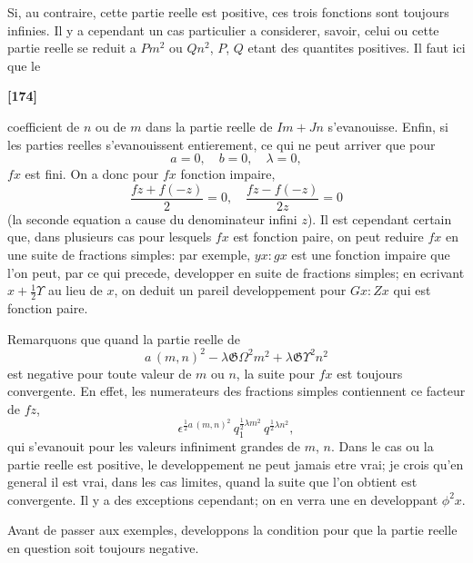 \documentclass[11pt,a4paper]{book}
\begin{document}
Si, au contraire, cette partie reelle est positive, ces trois fonctions sont toujours infinies.
Il y a cependant un cas particulier a considerer, savoir, celui ou cette partie reelle
se reduit a $Pm^2$ ou $Qn^2$, $P$, $Q$ etant des quantites positives. Il faut ici que le

\textbf{[174]}

coefficient de $n$ ou de $m$ dans la partie reelle de $Im + Jn$ s'evanouisse. Enfin, si les
parties reelles s'evanouissent entierement, ce qui ne peut arriver que pour
\[a = 0,\quad b = 0,\quad \lambda = 0,\]
$fx$ est fini. On a donc pour $fx$ fonction impaire,
\[\frac{fz + f(-z)}{2} = 0,\quad \frac{fz - f(-z)}{2z} = 0\]
(la seconde equation a cause du denominateur infini $z$). Il est cependant certain que,
dans plusieurs cas pour lesquels $fx$ est fonction paire, on peut reduire $fx$ en une suite
de fractions simples: par exemple, $yx : gx$ est une fonction impaire que l'on peut, par
ce qui precede, developper en suite de fractions simples; en ecrivant $x + \frac{1}{2}\Upsilon$ au lieu
de $x$, on deduit un pareil developpement pour $Gx : Zx$ qui est fonction paire.

Remarquons que quand la partie reelle de
\[a\, (m, n)^2 - \lambda\mathfrak{G}\Omega^2 m^2 + \lambda\mathfrak{G}\Upsilon^2 n^2\]
est negative pour toute valeur de $m$ ou $n$, la suite pour $fx$ est toujours convergente.
En effet, les numerateurs des fractions simples contiennent ce facteur de $fz$,
\[\epsilon^{\frac{1}{2}a\, (m, n)^2}\, q_1^{\frac{1}{2}\lambda m^2}\, q^{\frac{1}{2}\lambda n^2},\]
qui s'evanouit pour les valeurs infiniment grandes de $m$, $n$. Dans le cas ou la partie
reelle est positive, le developpement ne peut jamais etre vrai; je crois qu'en general
il est vrai, dans les cas limites, quand la suite que l'on obtient est convergente. Il
y a des exceptions cependant; on en verra une en developpant $\phi^2 x$.

Avant de passer aux exemples, developpons la condition pour que la partie reelle
en question soit toujours negative.
\end{document}
